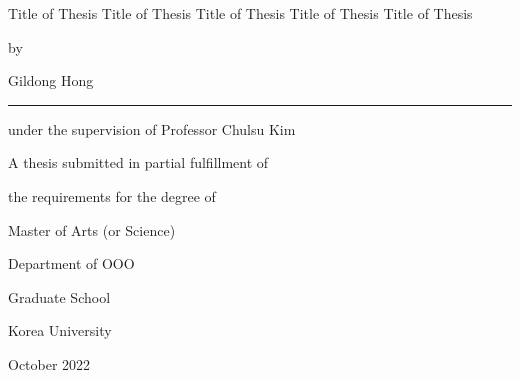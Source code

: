 \documentclass[11pt]{report}
\begin{document}
\newpage 
\begin{center}
\huge Title of Thesis Title of Thesis Title of Thesis Title of Thesis Title of Thesis  
\par\vspace{3.1cm} %
{\fontsize{16pt}{16pt}\selectfont by \par Gildong Hong \par}
\vspace{0.5cm}
\rule{.6\textwidth}{0.4pt} %
\par\vspace{0.2cm}
{\fontsize{16pt}{16pt}\selectfont under the supervision of Professor Chulsu Kim \par}
\vspace{0.7cm}
{\fontsize{16pt}{18pt}\selectfont A thesis submitted in partial fulfillment of \par
 the requirements for the degree of \par Master of Arts (or Science) \par }   
\vspace{10pt}
{\fontsize{16pt}{16pt}\selectfont Department of OOO} %
\par\vspace{1.5cm}
{\fontsize{18pt}{18pt}\selectfont Graduate School \par \vspace{0.5cm}
 Korea University \par} 
\vspace{1cm}
{\fontsize{14pt}{14pt}\selectfont October 2022} %
\end{center}

\end{document}
